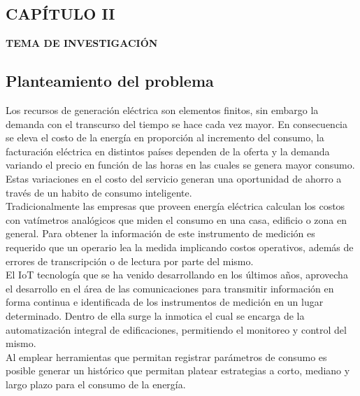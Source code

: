 \begin{center}
    \setcounter{section}{2}
    \section*{CAPÍTULO II}
    \vspace*{0.5in}
    \textbf{TEMA DE INVESTIGACIÓN}
\end{center}

\subsection{Planteamiento del problema}

    Los recursos de generación eléctrica son elementos finitos, sin embargo la demanda con el transcurso del tiempo se 
    hace cada vez mayor. En consecuencia se eleva el costo de la energía en proporción al incremento del consumo, 
    la facturación eléctrica en distintos países dependen de la oferta y la demanda variando el precio
    en función de las horas en las cuales se genera mayor consumo. Estas variaciones en el costo del servicio generan una 
    oportunidad de ahorro a través de un habito de consumo inteligente.\\
    
    Tradicionalmente las empresas que proveen energía eléctrica calculan los costos con vatímetros analógicos que miden el 
    consumo en una casa, edificio o zona en general. Para obtener la información de este instrumento de medición es 
    requerido que un operario lea la medida implicando costos operativos, además de errores de transcripción o de lectura
    por parte del mismo.\\

    El IoT tecnología que se ha venido desarrollando en los últimos años, aprovecha el desarrollo en el área de las 
    comunicaciones para transmitir información en forma continua e identificada de los instrumentos de medición en un
    lugar determinado. Dentro de ella surge la inmotica el cual se encarga de la automatización integral de
    edificaciones, permitiendo el monitoreo y control del mismo.\\
    
    Al emplear herramientas que permitan registrar parámetros de consumo es posible generar un histórico que permitan 
    platear estrategias a corto, mediano y largo plazo para el consumo de la energía.\\

